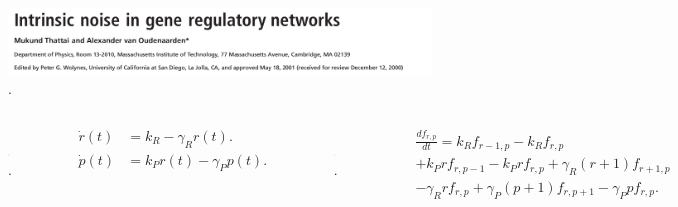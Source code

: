 \documentclass{beamer}
\begin{document}
\begin{frame}
\begin{figure}[p]
    \centering
    \includegraphics[width=1\textwidth]{title.png}\\
    \tiny \cite{thattai01}.
\end{figure}
\begin{columns}[c]

\begin{figure}[p]
    \centering
    \includegraphics[width=0.5\textwidth]{expressionsimple.png}\\
    \tiny \cite{thattai01}.
\end{figure}
\begin{align*}
\dot{r}(t) &= k_R - \gamma_Rr(t).\\
\dot{p}(t) &= k_Pr(t) - \gamma_Pp(t).
\end{align*}
\begin{figure}[p]
  \centering
    \includegraphics[width=0.4\textwidth]{scheme1.png}\\
    \tiny \cite{thattai01}.
\end{figure}
\begin{align*}
&\frac{d{f}_{r,p}}{dt} = k_Rf_{r-1,p} - k_Rf_{r,p}\\
&+ k_Prf_{r,p-1} - k_Prf_{r,p} + \gamma_R(r+1)f_{r+1,p}\\
&- \gamma_Rrf_{r,p} + \gamma_P(p+1)f_{r,p+1} - \gamma_Ppf_{r,p}.
\end{align*}
\end{columns}
\end{frame}
\end{document}
